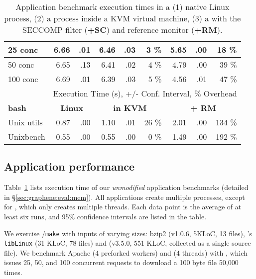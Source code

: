 \begin{table}[t!b!]
\begin{tabular}{|l|rr|rrr|rrr|}
25 conc    & 6.66 &.01 &6.46 &.03 &3 \% &5.65 &.00 &18 \%  \\\hline
50 conc    & 6.65 &.13 &6.41 &.02 &4 \% &4.79 &.00 &39 \%  \\\hline
100 conc   & 6.69 &.01 &6.39 &.03 &5 \% &4.56 &.01 &47 \%  \\\hline

\hline\hline

  & \multicolumn{8}{c|}{Execution Time (s), +/- Conf. Interval, \% Overhead} \\
\hline
{\bf bash } & \multicolumn{2}{c|}{\bf Linux} & \multicolumn{3}{c|}{{\bf in KVM}} & \multicolumn{3}{c|}{{\bf \graphene{} + RM}} \\
\hline

Unix utils & 0.87 & .00 & 1.10 & .01 & 26 \% & 2.01 & .00 & 134 \%  \\\hline
Unixbench  & 0.55 & .00 & 0.55 & .00 &  0 \% & 1.49 & .00 & 192 \%  \\\hline
\end{tabular}
\caption[Application benchmark results in Linux, KVM and \graphene{}]
{Application benchmark execution times in a (1) native Linux process, (2) a process inside a KVM virtual machine, (3) a \graphene{} \picoproc{} with the SECCOMP filter ({\bf +SC}) and reference monitor ({\bf +RM}). }
\label{tab:graphene:apps}
\end{table}


\subsection{Application performance}
\label{sec:eval:graphene:apps}

Table~\ref{tab:graphene:apps} lists 
execution time of our {\em unmodified} 
application benchmarks (detailed in \S\ref{sec:graphene:eval:mem}).
All applications create multiple processes,
except for \lighttpd{}, which only creates multiple threads.
Each data point is the average of at least six runs, 
and 95\% confidence intervals are listed in the table.

We exercise  {\tt \gcc{}}/{\tt make}
with inputs of varying sizes:
bzip2 (v1.0.6, 5KLoC, 13 files),
\graphene{}'s {\tt libLinux} (31 KLoC, 78 files)
and \gcc{} (v3.5.0, 551 KLoC, collected as a single source file). 
We benchmark Apache (4 preforked workers) and \lighttpd{} (4 threads) with 
\ab{},
which issues 25, 50, and 100 concurrent requests
to download a 100 byte file 50,000 times.

